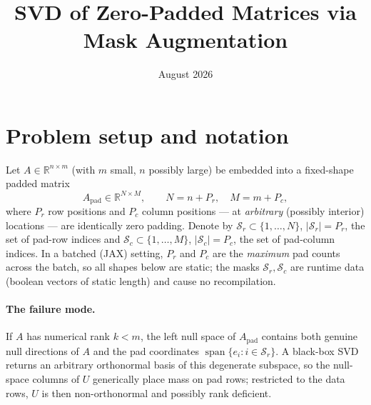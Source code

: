 \documentclass[11pt]{article}
\title{SVD of Zero-Padded Matrices via Mask Augmentation}
\author{}
\date{August 2026}
\newcommand{\R}{\mathbb{R}}
\newcommand{\Apad}{A_{\mathrm{pad}}}
\begin{document}
\maketitle

\section{Problem setup and notation}

Let $A \in \R^{n \times m}$ (with $m$ small, $n$ possibly large) be embedded into a
fixed-shape padded matrix
\[
  \Apad \in \R^{N \times M}, \qquad N = n + P_r, \quad M = m + P_c,
\]
where $P_r$ row positions and $P_c$ column positions --- at \emph{arbitrary}
(possibly interior) locations --- are identically zero padding. Denote by
$\mathcal{S}_r \subset \{1,\dots,N\}$, $|\mathcal{S}_r| = P_r$, the set of pad-row
indices and $\mathcal{S}_c \subset \{1,\dots,M\}$, $|\mathcal{S}_c| = P_c$, the set
of pad-column indices. In a batched (JAX) setting, $P_r$ and $P_c$ are the
\emph{maximum} pad counts across the batch, so all shapes below are static; the
masks $\mathcal{S}_r, \mathcal{S}_c$ are runtime data (boolean vectors of static
length) and cause no recompilation.

\paragraph{The failure mode.} If $A$ has numerical rank $k < m$, the left null
space of $\Apad$ contains both genuine null directions of $A$ and the pad
coordinates $\operatorname{span}\{e_i : i \in \mathcal{S}_r\}$. A black-box SVD
returns an arbitrary orthonormal basis of this degenerate subspace, so the
null-space columns of $U$ generically place mass on pad rows; restricted to the
data rows, $U$ is then non-orthonormal and possibly rank deficient.
\end{document}
